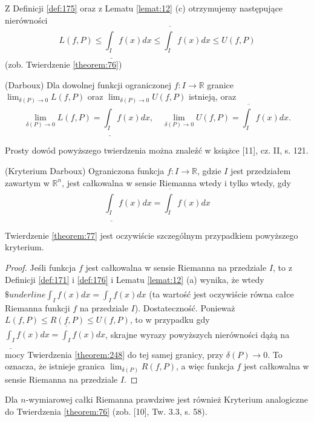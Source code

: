 \documentclass[leqno]{article}
\begin{document}
\begin{justify}
\begin{wniosek}
{
    Z Definicji \ref{def:175} oraz z Lematu \ref{lemat:12} (c) otrzymujemy następujące nierówności 
    \[
        L(f, P) \leqslant \underline{\int_{I}}f(x)dx \leqslant \overline{\int_{I}}f(x)dx \leqslant U(f, P)
    \]
    (zob. Twierdzenie \ref{theorem:76})
}
\end{wniosek}

\begin{theorem}
{
    (Darboux) Dla dowolnej funkcji ograniczonej $f : I \to \mathbb{R}$ granice $\lim_{\delta(P) \to 0}L(f, P)$ oraz 
    $\lim_{\delta(P) \to 0}U(f, P)$ istnieją, oraz 
    \[
        \lim_{\delta(P) \to 0}L(f, P) = \underline{\int_{I}}f(x)dx, \quad \lim_{\delta(P) \to 0}U(f, P) = \overline{\int_{I}}f(x)dx.
    \]
}
\end{theorem}

Prosty dowód powyższego twierdzenia można znaleźć w książce [11], cz. II, s. 121.

\begin{theorem}
{
    (Kryterium Darboux) Ograniczona funkcja $f : I \to \mathbb{R}$, gdzie $I$ jest przedziałem zawartym w $\mathbb{R}^n$, jest całkowalna w sensie Riemanna wtedy i tylko wtedy,
    gdy 
    \[
        \underline{\int_{I}}f(x)dx = \overline{\int_{I}}f(x)dx
    \]
}
\end{theorem}

Twierdzenie \ref{theorem:77} jest oczywiście szczególnym przypadkiem powyższego kryterium.

\begin{proof}
    Jeśli funkcja $f$ jest całkowalna w sensie Riemanna na przedziale $I$, to z Definicji \ref{def:171} i \ref{def:176} i Lematu \ref{lemat:12} (a)
    wynika, że wtedy $\$underline{\int_{I}}f(x)dx = \overline{\int_{I}}f(x)dx$ (ta wartość jest oczywiście równa całce Riemanna funkcji $f$ na przedziale $I$).
    Dostateczność. Ponieważ $L(f, P) \leqslant R(f,P) \leqslant U(f, P)$, to w przypadku gdy $\underline{\int_{I}}f(x)dx = \overline{\int_{I}}f(x)dx$,
    skrajne wyrazy powyższych nierówności dążą na mocy Twierdzenia \ref{theorem:248} do tej samej granicy, przy $\delta(P) \to 0$. To oznacza, że istnieje granica 
    $\lim_{\delta(P)}R(f, P)$, a więc funkcja $f$ jest całkowalna w sensie Riemanna na przedziale $I$.
\end{proof}

\begin{uwaga}
    Dla $n$-wymiarowej całki Riemanna prawdziwe jest również Kryterium analogiczne do Twierdzenia \ref{theorem:76} (zob. [10], Tw. 3.3, s. 58).
\end{uwaga}


\end{justify}
\end{document}
